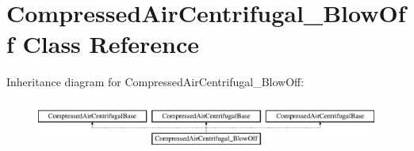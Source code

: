\hypertarget{class_compressed_air_centrifugal___blow_off}{}\section{Compressed\+Air\+Centrifugal\+\_\+\+Blow\+Off Class Reference}
\label{class_compressed_air_centrifugal___blow_off}
Inheritance diagram for Compressed\+Air\+Centrifugal\+\_\+\+Blow\+Off\+:\begin{figure}[H]
\begin{center}
\leavevmode
\includegraphics[height=1.689291cm]{dc/d65/class_compressed_air_centrifugal___blow_off}
\end{center}
\end{figure}
